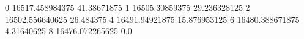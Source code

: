 0 16517.458984375 41.38671875
1 16505.30859375 29.236328125
2 16502.556640625 26.484375
4 16491.94921875 15.876953125
6 16480.388671875 4.31640625
8 16476.072265625 0.0
